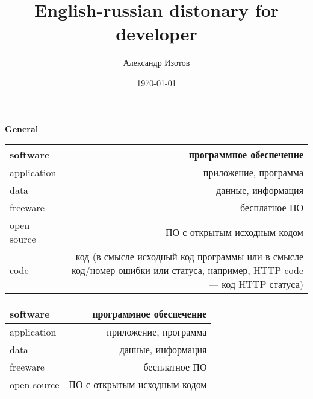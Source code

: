 \documentclass[a4paper,16pt]{article} %
\title{English-russian distonary for developer}
\date{\today} %
\author{Александр Изотов}
\begin{document}
	\begin{center}
		\textbf{General}
	\end{center}
	\begin{tabular}{ | l | r |}
		\hline
			software & программное обеспечение \\ \hline
			application & приложение, программа \\ \hline
			data & данные, информация \\ \hline
			freeware & бесплатное ПО \\ \hline
			open source & ПО с открытым исходным кодом \\ \hline
			code & код (в смысле исходный код программы или в смысле код/номер ошибки или статуса, например, HTTP code — код HTTP статуса) \\
		\hline
	\end{tabular} 
	\begin{tabular}{ | l | r |}
		\hline
			software & программное обеспечение \\ \hline
			application & приложение, программа \\ \hline
			data & данные, информация \\ \hline
			freeware & бесплатное ПО \\ \hline
			open source & ПО с открытым исходным кодом \\
		\hline
	\end{tabular}
\end{document}
